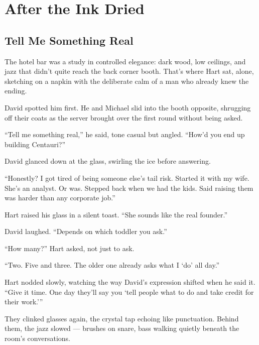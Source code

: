 \section{After the Ink Dried}

\subsection{Tell Me Something Real}

The hotel bar was a study in controlled elegance: dark wood, low ceilings, and jazz that didn’t 
quite reach the back corner booth.
That’s where Hart sat, alone, sketching on a napkin with the deliberate calm of a man who already knew 
the ending.

David spotted him first.
He and Michael slid into the booth opposite, shrugging off their coats as the server brought over the 
first round without being asked.

“Tell me something real,” he said, tone casual but angled. “How’d you end up building Centauri?”

David glanced down at the glass, swirling the ice before answering.

“Honestly? I got tired of being someone else’s tail risk. Started it with my wife. She’s an analyst. 
Or was. Stepped back when we had the kids. Said raising them was harder than any corporate job.”

Hart raised his glass in a silent toast. “She sounds like the real founder.”

David laughed. “Depends on which toddler you ask.”

“How many?” Hart asked, not just to ask.

“Two. Five and three. The older one already asks what I ‘do’ all day.”

Hart nodded slowly, watching the way David’s expression shifted when he said it.
“Give it time. One day they’ll say you ‘tell people what to do and take credit for their work.’”

They clinked glasses again, the crystal tap echoing like punctuation. Behind them, the jazz slowed — 
brushes on snare, bass walking quietly beneath the room’s conversations.

\medskip

